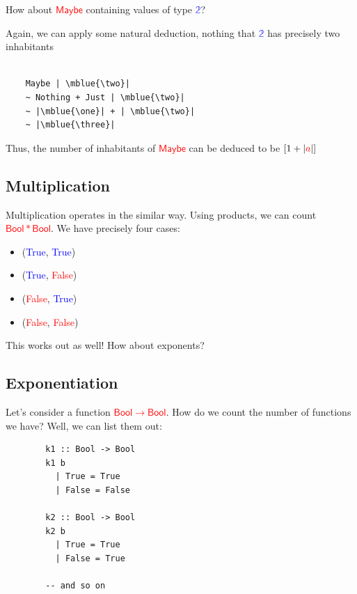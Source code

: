\documentclass[tikz]{beamer}
\newcommand{\cat}[1]{\bm{ \mathsf{#1} }}
\newcommand{\one}{\bm{\mathbb{1}}}
\newcommand{\two}{\bm{\mathbb{2}}}
\newcommand{\three}{\bm{\mathbb{3}}}
\newcommand{\red}[1]{\textcolor{red}{#1}}
\newcommand{\mred}[1]{\textcolor{red}{$#1$}}
\newcommand{\blue}[1]{\textcolor{blue}{#1}}
\newcommand{\mblue}[1]{\textcolor{blue}{$#1$}}
\theoremstyle{definition}
\begin{document}
\frame
{ 
	How about \mred{\cat{Maybe}} containing values of type \mblue{\two}? 
}

\begin{frame}[fragile]

Again, we can apply some natural deduction, nothing that  \mblue{\two} has precisely two inhabitants
	\begin{verbatim}
	
	Maybe | \mblue{\two}|
	~ Nothing + Just | \mblue{\two}|
	~ |\mblue{\one}| + | \mblue{\two}|
	~ |\mblue{\three}| 
	\end{verbatim}
\end{frame}

\frame
{
	Thus, the number of inhabitants of \mred{\cat{Maybe}} can be deduced to be $[1 + |\red{a}|]$
}

\subsection{Multiplication}

\frame
{

	Multiplication operates in the similar way. Using products, we can count \mred{\cat{Bool} * \cat{Bool}}. We have precisely four cases: 
	
	\begin{itemize}	
		\item (\blue{True}, \blue{True})
		\item(\blue{True}, \red{False})
		\item (\red{False}, \blue{True})
		\item (\red{False}, \red{False}) 
	\end{itemize}
}

\frame
{
	This works out as well! How about exponents?
}

\subsection{Exponentiation}

\begin{frame}[fragile]
	Let's consider a function \mred{\cat{Bool} \to \cat{Bool}}. How do we count the number of functions we have? Well, we can list them out: 
	
	\begin{verbatim}
		k1 :: Bool -> Bool
		k1 b 
		  | True = True
		  | False = False 
		
		k2 :: Bool -> Bool 
		k2 b 
		  | True = True
		  | False = True 
		  		
		-- and so on	
	\end{verbatim}
	
\end{frame}
\end{document}
